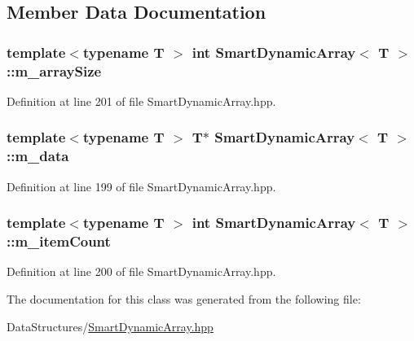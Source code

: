 \subsection{Member Data Documentation}
\subsubsection[{\texorpdfstring{m\+\_\+array\+Size}{m_arraySize}}]{\setlength{\rightskip}{0pt plus 5cm}template$<$typename T $>$ int {\bf Smart\+Dynamic\+Array}$<$ T $>$\+::m\+\_\+array\+Size\hspace{0.3cm}{\ttfamily [private]}}\hypertarget{classSmartDynamicArray_a57e2d12b656b0aa81f21a8a805f3acf1}{}\label{classSmartDynamicArray_a57e2d12b656b0aa81f21a8a805f3acf1}


Definition at line 201 of file Smart\+Dynamic\+Array.\+hpp.

\subsubsection[{\texorpdfstring{m\+\_\+data}{m_data}}]{\setlength{\rightskip}{0pt plus 5cm}template$<$typename T $>$ T$\ast$ {\bf Smart\+Dynamic\+Array}$<$ T $>$\+::m\+\_\+data\hspace{0.3cm}{\ttfamily [private]}}\hypertarget{classSmartDynamicArray_a5c85d1791982c4366cd7f01b973aadb4}{}\label{classSmartDynamicArray_a5c85d1791982c4366cd7f01b973aadb4}


Definition at line 199 of file Smart\+Dynamic\+Array.\+hpp.

\subsubsection[{\texorpdfstring{m\+\_\+item\+Count}{m_itemCount}}]{\setlength{\rightskip}{0pt plus 5cm}template$<$typename T $>$ int {\bf Smart\+Dynamic\+Array}$<$ T $>$\+::m\+\_\+item\+Count\hspace{0.3cm}{\ttfamily [private]}}\hypertarget{classSmartDynamicArray_a132e6ffa1678a3ef2eafad1195df82e4}{}\label{classSmartDynamicArray_a132e6ffa1678a3ef2eafad1195df82e4}


Definition at line 200 of file Smart\+Dynamic\+Array.\+hpp.



The documentation for this class was generated from the following file\+:\begin{DoxyCompactItemize}
\item 
Data\+Structures/\hyperlink{SmartDynamicArray_8hpp}{Smart\+Dynamic\+Array.\+hpp}\end{DoxyCompactItemize}
